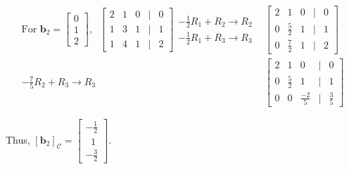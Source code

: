 \documentclass[a4paper,11pt,reqno]{amsart}
\numberwithin{equation}{section}
\begin{document}
\begin{enumerate}
\begin{center}
{{     
    \begin{eqnarray*}
    \text{For } \mathbf{b}_2 = \begin{bmatrix} 0 \\ 1 \\ 2 \end{bmatrix}, \;\;
    \begin{bmatrix} 
    2 & 1 & 0 & | & 0 \\ 
    1 & 3 & 1 & | & 1 \\ 
    1 & 4 & 1 & | & 2 
    \end{bmatrix}
    \begin{array}{c}
      -\frac{1}{2} R_1 + R_2 \to R_2\\  
      - \frac{1}{2} R_1 + R_3 \to R_3 
    \end{array}& 
    \begin{bmatrix} 
    2 & 1 & 0 & | & 0\\ 
    0 & \frac{5}{2} & 1 & | & 1 \\ 
    0 & \frac{7}{2} & 1 & | & 2 
    \end{bmatrix}\\
    - \frac{7}{5} R_2 + R_3 \to R_3&
    \begin{bmatrix} 
    2 & 1 & 0 & | & 0 \\ 
    0 & \frac{5}{2} & 1 & | & 1 \\ 
    0 & 0 & \frac{-2}{5} & | & \frac{3}{5} 
    \end{bmatrix}
    \end{eqnarray*}

    Thus, \( [\mathbf{b}_2]_{\mathcal{C}} = \begin{bmatrix} -\frac{1}{2} \\ \;\; 1 \\ -\frac{3}{2} \end{bmatrix} \).


}}
\end{center}
\end{enumerate}
\end{document}
